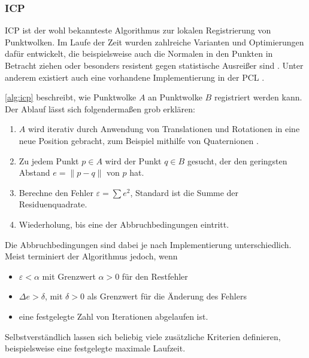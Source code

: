 \subsubsection{\acl{ICP}}
\label{subsubsec:icp}

\ac{ICP} \cite{besl1992method} ist der wohl bekannteste Algorithmus zur lokalen Registrierung von Punktwolken.
Im Laufe der Zeit wurden zahlreiche Varianten und Optimierungen dafür entwickelt, die beispielsweise auch die Normalen in den Punkten in Betracht ziehen oder besonders resistent gegen statistische Ausreißer sind \cite{rusinkiewicz2001efficient, bouaziz2013sparse, munch2010modified}. Unter anderem existiert auch eine vorhandene Implementierung in der \ac{PCL} \cite{holz2015registration}.

\autoref{alg:icp} beschreibt, wie Punktwolke $A$ an Punktwolke $B$ registriert werden kann.
Der Ablauf lässt sich folgendermaßen grob erklären:

\begin{enumerate}
\item $A$ wird iterativ durch Anwendung von Translationen und Rotationen in eine neue Position gebracht, zum Beispiel mithilfe von Quaternionen \cite{horn1987closed}.
\item Zu jedem Punkt $p \in A$ wird der Punkt $q \in B$ gesucht, der den geringsten Abstand $e = \|p - q\|$ von $p$ hat.
\item Berechne den Fehler $\varepsilon = \sum e^2$, Standard ist die Summe der Residuenquadrate.
\item Wiederholung, bis eine der Abbruchbedingungen eintritt.
\end{enumerate}

Die Abbruchbedingungen sind dabei je nach Implementierung unterschiedlich.
Meist terminiert der Algorithmus jedoch, wenn

\begin{itemize}
\item $\varepsilon < \alpha$ mit Grenzwert $\alpha > 0$ für den Restfehler
\item $\Delta e > \delta$, mit $\delta > 0$ als Grenzwert für die Änderung des Fehlers
\item eine festgelegte Zahl von Iterationen abgelaufen ist.
\end{itemize}

Selbstverständlich lassen sich beliebig viele zusätzliche Kriterien definieren, beispielsweise eine festgelegte maximale Laufzeit.


